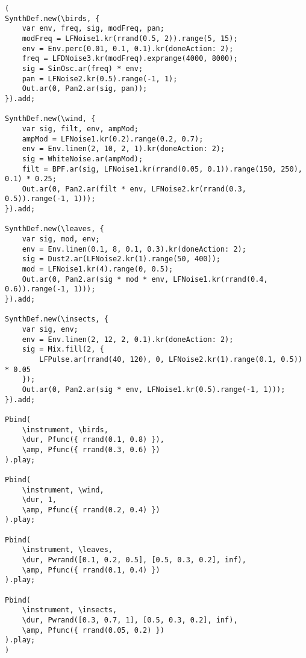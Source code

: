 \begin{minipage}[t]{1\textwidth}
    \centering
    \begin{lstlisting}[style=SuperCollider-IDE, basicstyle=\footnotesize\ttfamily, numbers=none]
(
SynthDef.new(\birds, {
    var env, freq, sig, modFreq, pan;
    modFreq = LFNoise1.kr(rrand(0.5, 2)).range(5, 15);
    env = Env.perc(0.01, 0.1, 0.1).kr(doneAction: 2);
    freq = LFDNoise3.kr(modFreq).exprange(4000, 8000);
    sig = SinOsc.ar(freq) * env;
    pan = LFNoise2.kr(0.5).range(-1, 1);
    Out.ar(0, Pan2.ar(sig, pan));
}).add;

SynthDef.new(\wind, {
    var sig, filt, env, ampMod;
    ampMod = LFNoise1.kr(0.2).range(0.2, 0.7);
    env = Env.linen(2, 10, 2, 1).kr(doneAction: 2);
    sig = WhiteNoise.ar(ampMod);
    filt = BPF.ar(sig, LFNoise1.kr(rrand(0.05, 0.1)).range(150, 250), 0.1) * 0.25;
    Out.ar(0, Pan2.ar(filt * env, LFNoise2.kr(rrand(0.3, 0.5)).range(-1, 1)));
}).add;

SynthDef.new(\leaves, {
    var sig, mod, env;
    env = Env.linen(0.1, 8, 0.1, 0.3).kr(doneAction: 2);
    sig = Dust2.ar(LFNoise2.kr(1).range(50, 400));
    mod = LFNoise1.kr(4).range(0, 0.5);
    Out.ar(0, Pan2.ar(sig * mod * env, LFNoise1.kr(rrand(0.4, 0.6)).range(-1, 1)));
}).add;

SynthDef.new(\insects, {
    var sig, env;
    env = Env.linen(2, 12, 2, 0.1).kr(doneAction: 2);
    sig = Mix.fill(2, {
        LFPulse.ar(rrand(40, 120), 0, LFNoise2.kr(1).range(0.1, 0.5)) * 0.05
    });
    Out.ar(0, Pan2.ar(sig * env, LFNoise1.kr(0.5).range(-1, 1)));
}).add;

Pbind(
    \instrument, \birds,
    \dur, Pfunc({ rrand(0.1, 0.8) }),
    \amp, Pfunc({ rrand(0.3, 0.6) })
).play;

Pbind(
    \instrument, \wind,
    \dur, 1,
    \amp, Pfunc({ rrand(0.2, 0.4) })
).play;

Pbind(
    \instrument, \leaves,
    \dur, Pwrand([0.1, 0.2, 0.5], [0.5, 0.3, 0.2], inf),
    \amp, Pfunc({ rrand(0.1, 0.4) })
).play;

Pbind(
    \instrument, \insects,
    \dur, Pwrand([0.3, 0.7, 1], [0.5, 0.3, 0.2], inf),
    \amp, Pfunc({ rrand(0.05, 0.2) })
).play;
)                                       
    \end{lstlisting}
    \vspace{1cm}
\end{minipage}


